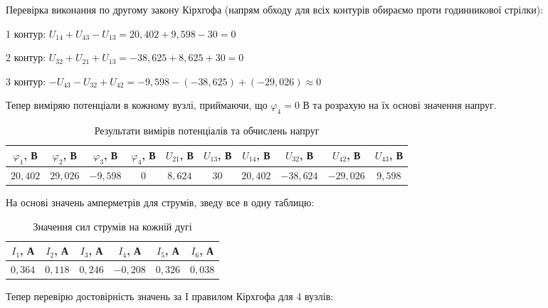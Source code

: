 \documentclass[12pt,a4paper]{article}
\begin{document}
    Перевірка виконання по другому закону Кірхгофа (напрям обходу для всіх контурів обираємо проти годинникової стрілки):

    \vspace{1em}

    1 контур: $U_{14} + U_{43} - U_{13} = 20{,}402 + 9{,}598 - 30 = 0$
    \vspace{1em}

    2 контур: $U_{32} + U_{21} + U_{13} = -38{,}625 + 8{,}625 + 30 = 0$
    \vspace{1em}

    3 контур: $-U_{43} - U_{32} + U_{42} = -9{,}598 - (-38{,}625) + (-29{,}026) \approx 0$

    \newpage

    Тепер виміряю потенціали в кожному вузлі, приймаючи, що $\varphi_4 = 0$ В та розрахую на їх основі значення напруг. 

    \begin{table}[h!]
        \centering
        \begin{tabular}{|c|c|c|c|c|c|c|c|c|c|}
            \hline
            $\varphi_1$, В & $\varphi_2$, В & $\varphi_3$, В & $\varphi_4$, В & $U_{21}$, В & $U_{13}$, В & $U_{14}$, В & $U_{32}$, В & $U_{42}$, В & $U_{43}$, В \\
            \hline
            $20{,}402$ & $29{,}026$ & $-9{,}598$ & $0$ & $8{,}624$ & $30$ & $20{,}402$ & $-38{,}624$ & $-29{,}026$ & $9{,}598$\\
            \hline
        \end{tabular}
        \caption{Результати вимірів потенціалів та обчислень напруг}
    \end{table}

    На основі значень амперметрів для струмів, зведу все в одну таблицю: 

    \begin{table}[h!]
        \centering
            \begin{tabular}{|c|c|c|c|c|c|}
            \hline
            $I_1$, А & $I_2$, А & $I_3$, А & $I_4$, А & $I_5$, А & $I_6$, А \\
            \hline
            $0{,}364$ & $0{,}118$ & $0{,}246$ & $-0{,}208$ & $0{,}326$ & $0{,}038$\\
            \hline
        \end{tabular}
        \caption{Значення сил струмів на кожній дугі}
    \end{table}

    Тепер перевірю достовірність значень за I правилом Кірхгофа для 4 вузлів:
\end{document}
